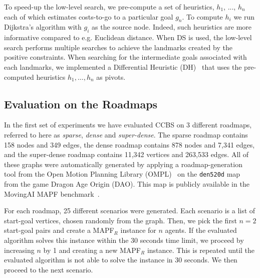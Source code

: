 \documentclass[letterpaper]{article} %
\newcommand\konstantin[1]{\nb{\textbf{Konstantin:}}{red}{#1}}
\newcommand\roni[1]{\nb{\textbf{Roni:}}{orange}{#1}}
\newcommand{\ccbs}{\ac{CCBS}\xspace}
\newcommand{\mapfr}{{MAPF}$_R$\xspace}
\newcommand{\mapf}{\ac{MAPF}\xspace}
\newcommand{\ds}{\ac{DS}\xspace}
\begin{document}
To speed-up the low-level search, we pre-compute a set of heuristics, $h_1$, ..., $h_n$ each of which estimates costs-to-go to a particular goal $g_n$. To compute $h_i$ we run Dijkstra's algorithm with $g_i$ as the source node. Indeed, such heuristics are more informative compared to e.g. Euclidean distance.
When \ds is used, the low-level search performs multiple searches to achieve the landmarks created by the positive constraints. When searching for the intermediate goals associated with each landmarks, we implemented a Differential Heuristic (DH)~\cite{goldenberg2011compressed} that uses the pre-computed heuristics $h_1,\ldots, h_n$ as pivots. %



\subsection{Evaluation on the Roadmaps}

In the first set of experiments we have evaluated \ccbs on 3 different roadmaps, referred to here as \emph{sparse}, \emph{dense} and \emph{super-dense}. The sparse roadmap contains 158 nodes and 349 edges, the dense roadmap contains 878 nodes and 7,341 edges, and the super-dense roadmap contains 11,342 vertices and 263,533 edges. All of these graphs were automatically generated by applying a roadmap-generation tool from the Open Motion Planning Library (OMPL)~\cite{sucan2012ompl} on the \texttt{den520d} map from the game Dragon Age Origin (DAO). This map is publicly available in the MovingAI \mapf benchmark~\cite{stern2019multi}.

For each roadmap, 25 different scenarios were generated. Each scenario is a list of start-goal vertices, chosen randomly from the graph.
Then, we pick the first $n=2$ start-goal pairs and create a \mapfr instance for $n$ agents. If the evaluated algorithm solves this instance within the 30 seconds time limit, we proceed by increasing $n$ by 1 and creating a new \mapfr instance.
This is repeated until the evaluated algorithm is not able to solve the instance in 30 seconds. We then proceed to the next scenario.
\end{document}
